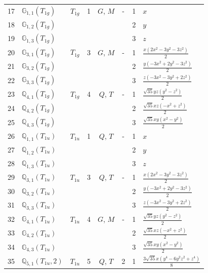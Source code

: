 \documentclass[fleqn,10pt,landscape]{jsarticle}
\begin{document}
\begin{longtable}[l]{clcccccl}
17 & $\mathbb{G}_{1,1}(T_{1g})$ & $T_{1g}$ & 1 & $G$, $M$ & - & 1 & $x$ \\
18 & $\mathbb{G}_{1,2}(T_{1g})$ &  &  &  &  & 2 & $y$ \\
19 & $\mathbb{G}_{1,3}(T_{1g})$ &  &  &  &  & 3 & $z$ \\ \hline
20 & $\mathbb{G}_{3,1}(T_{1g})$ & $T_{1g}$ & 3 & $G$, $M$ & - & 1 & $\frac{x \left(2 x^{2} - 3 y^{2} - 3 z^{2}\right)}{2}$ \\
21 & $\mathbb{G}_{3,2}(T_{1g})$ &  &  &  &  & 2 & $\frac{y \left(- 3 x^{2} + 2 y^{2} - 3 z^{2}\right)}{2}$ \\
22 & $\mathbb{G}_{3,3}(T_{1g})$ &  &  &  &  & 3 & $\frac{z \left(- 3 x^{2} - 3 y^{2} + 2 z^{2}\right)}{2}$ \\ \hline
23 & $\mathbb{Q}_{4,1}(T_{1g})$ & $T_{1g}$ & 4 & $Q$, $T$ & - & 1 & $\frac{\sqrt{35} y z \left(y^{2} - z^{2}\right)}{2}$ \\
24 & $\mathbb{Q}_{4,2}(T_{1g})$ &  &  &  &  & 2 & $\frac{\sqrt{35} x z \left(- x^{2} + z^{2}\right)}{2}$ \\
25 & $\mathbb{Q}_{4,3}(T_{1g})$ &  &  &  &  & 3 & $\frac{\sqrt{35} x y \left(x^{2} - y^{2}\right)}{2}$ \\ \hline
26 & $\mathbb{Q}_{1,1}(T_{1u})$ & $T_{1u}$ & 1 & $Q$, $T$ & - & 1 & $x$ \\
27 & $\mathbb{Q}_{1,2}(T_{1u})$ &  &  &  &  & 2 & $y$ \\
28 & $\mathbb{Q}_{1,3}(T_{1u})$ &  &  &  &  & 3 & $z$ \\ \hline
29 & $\mathbb{Q}_{3,1}(T_{1u})$ & $T_{1u}$ & 3 & $Q$, $T$ & - & 1 & $\frac{x \left(2 x^{2} - 3 y^{2} - 3 z^{2}\right)}{2}$ \\
30 & $\mathbb{Q}_{3,2}(T_{1u})$ &  &  &  &  & 2 & $\frac{y \left(- 3 x^{2} + 2 y^{2} - 3 z^{2}\right)}{2}$ \\
31 & $\mathbb{Q}_{3,3}(T_{1u})$ &  &  &  &  & 3 & $\frac{z \left(- 3 x^{2} - 3 y^{2} + 2 z^{2}\right)}{2}$ \\ \hline
32 & $\mathbb{G}_{4,1}(T_{1u})$ & $T_{1u}$ & 4 & $G$, $M$ & - & 1 & $\frac{\sqrt{35} y z \left(y^{2} - z^{2}\right)}{2}$ \\
33 & $\mathbb{G}_{4,2}(T_{1u})$ &  &  &  &  & 2 & $\frac{\sqrt{35} x z \left(- x^{2} + z^{2}\right)}{2}$ \\
34 & $\mathbb{G}_{4,3}(T_{1u})$ &  &  &  &  & 3 & $\frac{\sqrt{35} x y \left(x^{2} - y^{2}\right)}{2}$ \\ \hline
35 & $\mathbb{Q}_{5,1}(T_{1u},2)$ & $T_{1u}$ & 5 & $Q$, $T$ & 2 & 1 & $\frac{3 \sqrt{35} x \left(y^{4} - 6 y^{2} z^{2} + z^{4}\right)}{8}$ \\

\end{longtable}
\end{document}

